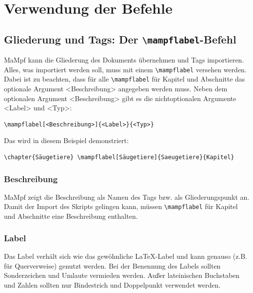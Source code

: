 \documentclass[parskip=off,index=totocnumbered]{scrartcl}
\begin{document}
\section{Verwendung der Befehle}
\subsection{Gliederung und Tags: Der \texttt{\textbackslash mampflabel}-Befehl}

MaMpf kann die Gliederung des Dokuments übernehmen und Tags importieren. Alles, was importiert werden soll, muss mit einem \verb|\mampflabel| versehen werden. Dabei ist zu beachten, dass für alle \verb|\mampflabel| für Kapitel und Abschnitte das optionale Argument <Beschreibung> angegeben werden muss. Neben dem optionalen Argument <Beschreibung> gibt es die nichtoptionalen Argumente <Label> und <Typ>:
\begin{verbatim}
\mampflabel[<Beschreibung>]{<Label>}{<Typ>}
\end{verbatim}
\noindent Das wird in diesem Beispiel demonstriert:
\begin{verbatim}
\chapter{Säugetiere} \mampflabel[Säugetiere]{Saeugetiere}{Kapitel}
\end{verbatim}
   

\subsubsection{Beschreibung}
MaMpf zeigt die Beschreibung als Namen des Tags bzw. als Gliederungspunkt an. Damit der Import des Skripts gelingen kann, müssen \verb|\mampflabel| für Kapitel und Abschnitte eine Beschreibung enthalten.


\subsubsection{Label}
Das Label verhält sich wie das gewöhnliche \LaTeX-Label und kann genauso (z.B. für Querverweise) genutzt werden. Bei der Benennung des Labels sollten Sonderzeichen und Umlaute vermieden werden. Außer lateinischen Buchstaben und Zahlen sollten nur Bindestrich und Doppelpunkt verwendet werden.

\end{document}
